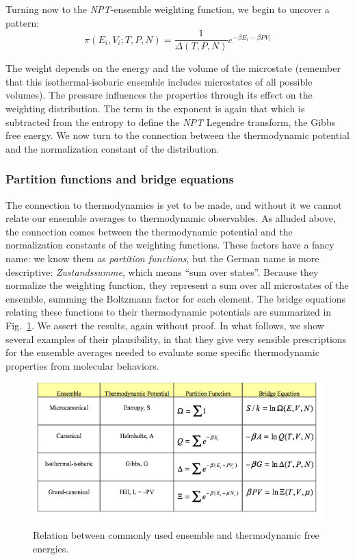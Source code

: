 \documentclass[]{article}
\begin{document}
Turning now to the \emph{NPT}-ensemble weighting function, we begin to uncover
a pattern:
\[\pi ({E_i},{V_i};T,P,N) = \frac{1}{{\Delta (T,P,N)}}{e^{ - \beta {E_i} - \beta P{V_i}}}\]

The weight depends on the energy and the volume of the microstate
(remember that this isothermal-isobaric ensemble includes microstates of
all possible volumes). The pressure influences the properties through
its effect on the weighting distribution. The term in the exponent is
again that which is subtracted from the entropy to define the \emph{NPT}
Legendre transform, the Gibbs free energy. We now turn to the connection
between the thermodynamic potential and the normalization constant of
the distribution.

\subsubsection{Partition functions and bridge
equations}\label{partition-functions-and-bridge-equations}

The connection to thermodynamics is yet to be made, and without it we
cannot relate our ensemble averages to thermodynamic observables. As
alluded above, the connection comes between the thermodynamic potential
and the normalization constants of the weighting functions. These
factors have a fancy name: we know them as \emph{partition functions},
but the German name is more descriptive: \emph{Zustandssumme}, which means
``sum over states''. Because they normalize the weighting function, they
represent a sum over all microstates of the ensemble, summing the
Boltzmann factor for each element. The bridge equations relating these
functions to their thermodynamic potentials are summarized in
Fig.~\ref{fig:bridgeEqns}. We assert the results, again without proof. In what follows, we
show several examples of their plausibility, in that they give very
sensible prescriptions for the ensemble averages needed to evaluate some
specific thermodynamic properties from molecular behaviors.

\begin{figure}
\includegraphics[width=\textwidth]{image011}
\caption{\label{fig:bridgeEqns}Relation between commonly used ensemble and thermodynamic free energies.}
\end{figure}
\end{document}

